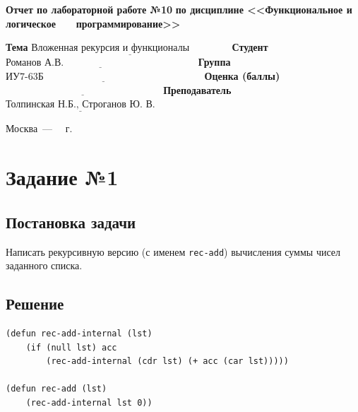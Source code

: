 \documentclass[12pt]{report}
\begin{document}
\begin{titlepage}
		\begin{center}
			\noindent\begin{minipage}{1.1\textwidth}\centering
				\Large\textbf{  Отчет по лабораторной работе №10}\newline
				\textbf{по дисциплине <<Функциональное и логическое}\newline
				\textbf{~~~программирование>>}\newline\newline
			\end{minipage}
		\end{center}
		
		\noindent\textbf{Тема} $\underline{\text{Вложенная рекурсия и функционалы~~~~~~~~~~~~}}$\newline\newline
		\noindent\textbf{Студент} $\underline{\text{Романов А.В.~~~~~~~~~~~~~~~~~~~~~~~~~~~~~~~~~~~~~~~~}}$\newline\newline
		\noindent\textbf{Группа} $\underline{\text{ИУ7-63Б~~~~~~~~~~~~~~~~~~~~~~~~~~~~~~~~~~~~~~~~~~~~~~~~}}$\newline\newline
		\noindent\textbf{Оценка (баллы)} $\underline{\text{~~~~~~~~~~~~~~~~~~~~~~~~~~~~~~~~~~~~~~~~~~~~~~~}}$\newline\newline
		\noindent\textbf{Преподаватель} $\underline{\text{Толпинская Н.Б., Строганов Ю. В.}}$\newline\newline\newline
		
		\begin{center}
			\vfill
			Москва~---~\the\year
			~г.
		\end{center}
	\end{titlepage}
	
	
\section*{Задание №1}
\subsection*{Постановка задачи}
Написать рекурсивную версию (с именем \texttt{rec-add}) вычисления суммы чисел заданного списка.

\subsection*{Решение}
\begin{lstlisting}
(defun rec-add-internal (lst)
	(if (null lst) acc
		(rec-add-internal (cdr lst) (+ acc (car lst)))))

(defun rec-add (lst)
	(rec-add-internal lst 0))
\end{lstlisting}
\end{document}
